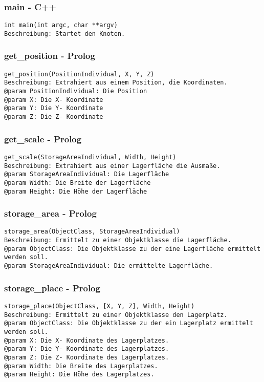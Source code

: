 \documentclass{suturo}
\begin{document}
\subsubsection{main - C++}
\begin{verbatim}
int main(int argc, char **argv)
Beschreibung: Startet den Knoten.
\end{verbatim}\label{func:findcentergazebo}


\subsubsection{get\_position - Prolog}
\begin{verbatim}
get_position(PositionIndividual, X, Y, Z)
Beschreibung: Extrahiert aus einem Position, die Koordinaten.
@param PositionIndividual: Die Position
@param X: Die X- Koordinate
@param Y: Die Y- Koordinate
@param Z: Die Z- Koordinate
\end{verbatim}\label{func:findposes}

\subsubsection{get\_scale - Prolog}
\begin{verbatim}
get_scale(StorageAreaIndividual, Width, Height)
Beschreibung: Extrahiert aus einer Lagerfläche die Ausmaße.
@param StorageAreaIndividual: Die Lagerfläche
@param Width: Die Breite der Lagerfläche
@param Height: Die Höhe der Lagerfläche
\end{verbatim}\label{func:estimatesurfacenormals}

\subsubsection{storage\_area - Prolog}
\begin{verbatim}
storage_area(ObjectClass, StorageAreaIndividual)
Beschreibung: Ermittelt zu einer Objektklasse die Lagerfläche.
@param ObjectClass: Die Objektklasse zu der eine Lagerfläche ermittelt werden soll.
@param StorageAreaIndividual: Die ermittelte Lagerfläche.
\end{verbatim}\label{func:apply3dfilter}

\subsubsection{storage\_place - Prolog}
\begin{verbatim}
storage_place(ObjectClass, [X, Y, Z], Width, Height)
Beschreibung: Ermittelt zu einer Objektklasse den Lagerplatz.
@param ObjectClass: Die Objektklasse zu der ein Lagerplatz ermittelt werden soll.
@param X: Die X- Koordinate des Lagerplatzes.
@param Y: Die Y- Koordinate des Lagerplatzes.
@param Z: Die Z- Koordinate des Lagerplatzes.
@param Width: Die Breite des Lagerplatzes.
@param Height: Die Höhe des Lagerplatzes.
\end{verbatim}\label{func:estimateplaneindices}
\end{document}
